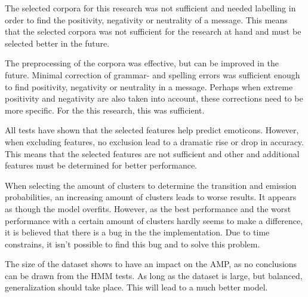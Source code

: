 The selected corpora for this research was not sufficient and needed labelling in order to find the positivity, negativity or neutrality of a message. This means that the selected corpora was not sufficient for the research at hand and must be selected better in the future.

The preprocessing of the corpora was effective, but can be improved in the future. Minimal correction of grammar- and spelling errors was sufficient enough to find positivity, negativity or neutrality in a message. Perhaps when extreme positivity and negativity are also taken into account, these corrections need to be more specific. For the this research, this was sufficient. 

All tests have shown that the selected features help predict emoticons. However, when excluding features, no exclusion lead to a dramatic rise or drop in accuracy. This means that the selected features are not sufficient and other and additional features must be determined for better performance. 

When selecting the amount of clusters to determine the transition and emission probabilities, an increasing amount of clusters leads to worse results. It appears as though the model overfits. However, as the best performance and the worst performance with a certain amount of clusters hardly seems to make a difference, it is believed that there is a bug in the the implementation. Due to time constrains, it isn't possible to find this bug and to solve this problem.

The size of the dataset shows to have an impact on the AMP, as no conclusions can be drawn from the HMM tests. As long as the dataset is large, but balanced, generalization should take place. This will lead to a much better model.

\begin{comment}
Discussion and Conclusions (0.5 – 1 page)
• Refer to the research questions you defined in your introduction.
• Any related work you are aware of?
• Challenges you observed?
• “Future work” (you do not need to do this work really J, but what would you change in the
model / what experiments you would run / etc, if you would have a chance to do this? What other
people should look into?
• Any thoughts / observation / wider implications
\end{comment}
